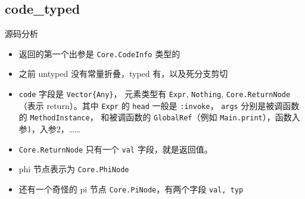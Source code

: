 \subsection{code_typed} 源码分析
\begin{itemize}
\item 返回的第一个出参是 \verb`Core.CodeInfo` 类型的
\item 之前 untyped 没有常量折叠，typed 有，以及死分支剪切
\item \verb`code` 字段是 \verb`Vector{Any}`， 元素类型有 \verb`Expr`, \verb`Nothing`, \verb`Core.ReturnNode`（表示 return）。其中 \verb`Expr` 的 \verb`head` 一般是 \verb`:invoke`， \verb`args` 分别是被调函数的 \verb`MethodInstance`， 和被调函数的 \verb`GlobalRef`（例如 \verb`Main.print`），函数入参1，入参2，……
\item \verb`Core.ReturnNode` 只有一个 \verb`val` 字段，就是返回值。
\item phi 节点表示为 \verb`Core.PhiNode`
\item 还有一个奇怪的 pi 节点 \verb`Core.PiNode`，有两个字段 \verb`val, typ`
\end{itemize}
